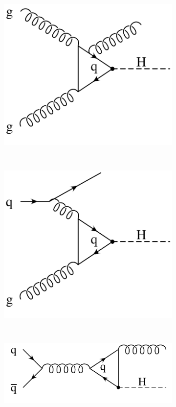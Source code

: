 \begin{figure}
\begin{subfigure}[]{0.3\textwidth}
	\includegraphics[width=\textwidth]{images/gluonfusion_real2.pdf}
	\caption{}
\end{subfigure}
~
\begin{subfigure}[]{0.3\textwidth}
	\includegraphics[width=\textwidth]{images/gq_hq.pdf}
	\caption{}
\end{subfigure}
~
\begin{subfigure}[]{0.3\textwidth}
	\includegraphics[width=\textwidth]{images/qq_hg.pdf}

\end{subfigure}
\end{figure}
